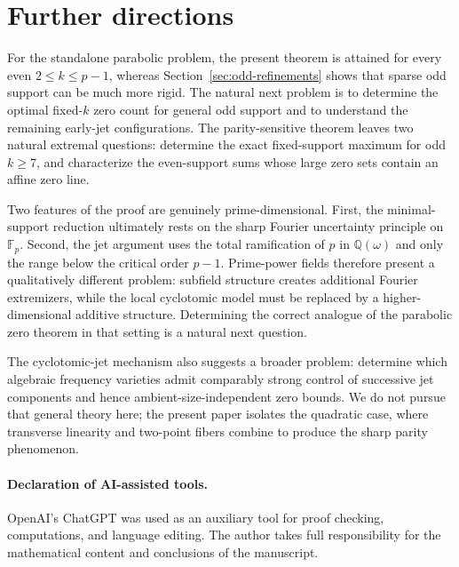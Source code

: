 \documentclass[11pt]{article}
\newcommand{\F}{\mathbb F}
\newcommand{\Q}{\mathbb Q}
\begin{document}
\section{Further directions}
\label{sec:discussion}

For the standalone parabolic problem, the present theorem is attained for
every even \(2\le k\le p-1\), whereas Section~\ref{sec:odd-refinements} shows
that sparse odd support can be much more rigid.  The natural next problem is
to determine the optimal fixed-\(k\) zero count for general odd support and
to understand the remaining early-jet configurations.  The parity-sensitive theorem leaves two natural extremal questions: determine the exact fixed-support maximum for odd \(k\ge7\), and characterize the even-support sums whose large zero sets contain an affine zero line.

Two features of the proof are genuinely prime-dimensional.  First, the
minimal-support reduction ultimately rests on the sharp Fourier uncertainty
principle on $\F_p$.  Second, the jet argument uses the total ramification of
$p$ in $\Q(\omega)$ and only the range below the critical order $p-1$.
Prime-power fields therefore present a qualitatively different problem:
subfield structure creates additional Fourier extremizers, while the local
cyclotomic model must be replaced by a higher-dimensional additive
structure.  Determining the correct analogue of the parabolic zero theorem
in that setting is a natural next question.

The cyclotomic-jet mechanism also suggests a broader problem: determine
which algebraic frequency varieties admit comparably strong control of
successive jet components and hence ambient-size-independent zero bounds.
We do not pursue that general theory here; the present paper isolates the
quadratic case, where transverse linearity and two-point fibers combine to
produce the sharp parity phenomenon.

\paragraph{Declaration of AI-assisted tools.}
OpenAI's ChatGPT was used as an auxiliary tool for proof checking,
computations, and language editing.  The author takes full responsibility for
the mathematical content and conclusions of the manuscript.
\end{document}
